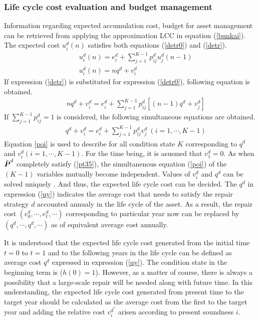 \subsubsection{Life cycle cost evaluation and budget management}
\label{6332}
Information regarding expected accumulation cost, budget for asset management can be retrieved from applying the approximation LCC in equation (\ref{bunkai}). The expected cost $u_i^d(n) $ satisfies both equations (\ref{detr0}) and (\ref{detr}).
\begin{eqnarray}
&& u_i^d(n)=e_i^d+ \sum_{j=1}^{K-1} p_{ij}^d u_j^d(n-1) \label{detr0} \\
&& u_i^d(n) = nq^d + v_i^d \label{detr}
\end{eqnarray}
If expression (\ref{detr}) is substituted for expression (\ref{detr0}), following equation is obtained. 
\begin{eqnarray}
&& nq^d + v_i^d =e_i^d+ \sum_{j=1}^{K-1} p_{ij}^d [(n-1)q^d + v_j^d]
\end{eqnarray}
If $\sum_{j=1} ^{K-1} p_{ij} ^d=1$ is considered, the following simultaneous equations are obtained. 
\begin{eqnarray}
&&  q^d + v_i^d= e_i^d + \sum_{j=1}^{K-1} p_{ij}^{d}v_j^d~(i=1,\cdots,K-1) \label{poi}
\end{eqnarray}
Equation \ref{poi} is used to describe for all condition state $K$ corresponding to $q^d$ and $v_i^d(i=1, \cdots,K-1)$. For the time being, it is asusmed that $v_1^d=0$. As when $\tilde{\mbox{\boldmath$P$}}^d$ completely satisfy (\ref{pt35}), the simultanenous equation (\ref{poi}) of the $(K-1)$ variables mutually become independent. Values of $v_i^d$ and $q^d$ can be solved uniquely \cite{howard}. And thus, the expected life cycle cost can be decided. The $q^d$ in expression (\ref{uy}) indicates the average cost that needs to satisfy the repair strategy $d$ accounted annualy in the life cycle of the asset. As a result, the repair cost $(e_0^d,\cdots,e_t^d,\cdots) $ corresponding to particular year now can be replaced by $(q^d,\cdots,q^d,\cdots) $ as of equivalent average cost annually.

It is understood that the expected life cycle cost generated from the initial time $t=0$ to $t=1$ and to the following years in the life cycle can be defined as average cost $q^d$ expressed in expression (\ref{uy}). The condition state in the beginning term is ($h(0)=1$). However, as a matter of course, there is always a possibility that a large-scale repair will be needed along with future time. In this understanding, the expected life cycle cost generated from present time to the target year should be calculated as the average cost from the first to the target year and adding the relative cost $v_i^{d^\ast} $ arisen according to present soundness $i$. 

